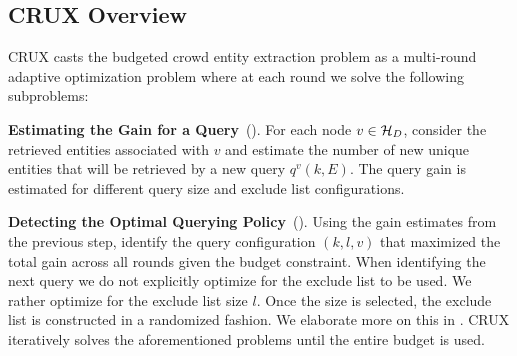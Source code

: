 %
\subsection{CRUX Overview}
\label{sec:framework}
CRUX casts the budgeted crowd entity extraction problem as a multi-round adaptive optimization problem where at each round we solve the following subproblems: 
\squishlist 
\item \textbf{Estimating the Gain for a Query}~(). For each node $v \in \mathcal{H}_D$, consider the retrieved entities associated with $v$ and estimate the number of new unique entities that will be retrieved by a new query $q^v(k,E)$. The query gain is estimated for different query size and exclude list configurations.
\item \textbf{Detecting the Optimal Querying Policy}~(). Using the gain estimates from the previous step, identify the query configuration $(k,l,v)$ that maximized the total gain across all rounds given the budget constraint. When identifying the next query we do not explicitly optimize for the exclude list to be used. We rather optimize for the exclude list size $l$. Once the size is selected, the exclude list is constructed in a randomized fashion. We elaborate more on this in .
\squishend
CRUX iteratively solves the aforementioned problems until the entire budget is used. 
%
